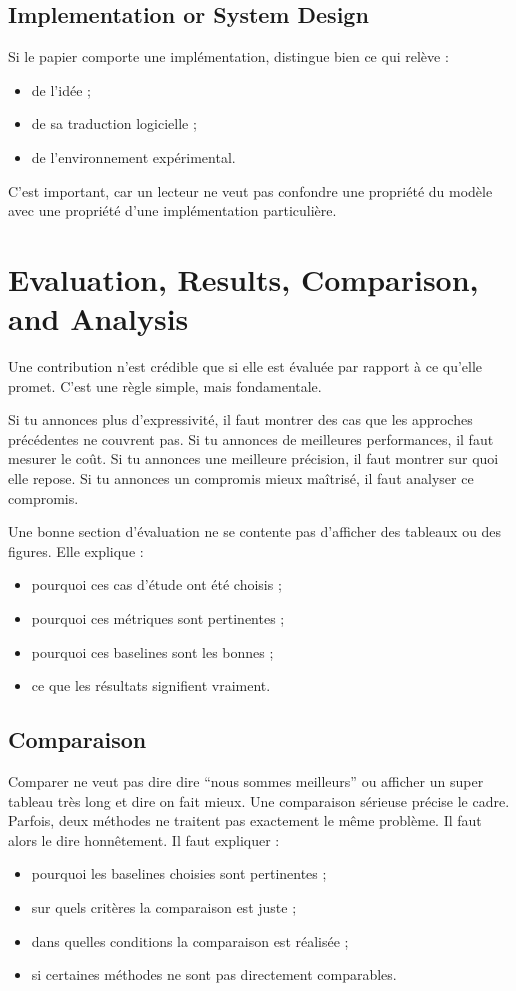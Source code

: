\documentclass[11pt,a4paper]{article}
\theoremstyle{definition}
\begin{document}
\subsection*{Implementation or System Design}

Si le papier comporte une implémentation, distingue bien ce qui relève :
\begin{itemize}
    \item de l'idée ;
    \item de sa traduction logicielle ;
    \item de l'environnement expérimental.
\end{itemize}

C'est important, car un lecteur ne veut pas confondre une propriété du modèle avec une propriété d'une implémentation particulière.

\section{Evaluation, Results, Comparison, and Analysis}

Une contribution n'est crédible que si elle est évaluée par rapport à ce qu'elle promet. C'est une règle simple, mais fondamentale.

Si tu annonces plus d'expressivité, il faut montrer des cas que les approches précédentes ne couvrent pas. Si tu annonces de meilleures performances, il faut mesurer le coût. Si tu annonces une meilleure précision, il faut montrer sur quoi elle repose. Si tu annonces un compromis mieux maîtrisé, il faut analyser ce compromis.

Une bonne section d'évaluation ne se contente pas d'afficher des tableaux ou des figures. Elle explique :
\begin{itemize}
    \item pourquoi ces cas d'étude ont été choisis ;
    \item pourquoi ces métriques sont pertinentes ;
    \item pourquoi ces baselines sont les bonnes ;
    \item ce que les résultats signifient vraiment.
\end{itemize}

\subsection*{Comparaison}

Comparer ne veut pas dire dire ``nous sommes meilleurs'' ou afficher un super tableau très long et dire on fait mieux. Une comparaison sérieuse précise le cadre. Parfois, deux méthodes ne traitent pas exactement le même problème. Il faut alors le dire honnêtement. Il faut expliquer :
\begin{itemize}
    \item pourquoi les baselines choisies sont pertinentes ;
    \item sur quels critères la comparaison est juste ;
    \item dans quelles conditions la comparaison est réalisée ;
    \item si certaines méthodes ne sont pas directement comparables.
\end{itemize}
\end{document}
